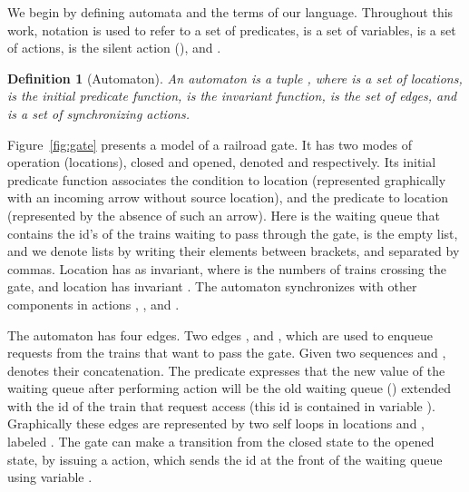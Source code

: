 \documentclass[submission,copyright,creativecommons,sharealike]{eptcs}
\newtheorem{definition}{Definition}
\begin{document}
We begin by defining automata and the terms of our language.
Throughout this work, notation  is used to refer to a set
of predicates,  is a set of variables,  is a
set of actions,  is the silent action (),
and .

\begin{definition}[Automaton]
  An automaton is a tuple , where  is a set of locations,  is the initial predicate function,  is the invariant function,  is the
  set of edges, and   is a set of
    synchronizing actions.
\end{definition}

Figure~\ref{fig:gate} presents a model of a railroad gate.
It has two modes of operation (locations), closed and opened, denoted
 and  respectively.
Its initial predicate function associates the condition  to location  (represented graphically with an incoming arrow
without source location), and the predicate  to location 
(represented by the absence of such an arrow). Here  is
the waiting queue that contains the id's of the trains waiting to pass
through the gate,  is the empty list, and we denote lists
by writing their elements between brackets, and separated by commas.
Location  has  as invariant, where  is the numbers of
trains crossing the gate, and location  has invariant .
The automaton synchronizes with other components in actions
, , and .

The automaton has four edges. Two edges , and ,
which are used to enqueue requests from the trains that want to pass
the gate. Given two sequences  and ,  denotes their concatenation. The predicate  expresses that the new value of the waiting queue after
performing action  will be the old waiting queue
() extended with the id of the train that request access
(this id is contained in variable ). Graphically these edges are
represented by two self loops in locations  and , labeled
.
The gate can make a transition from the closed state to the opened
state, by issuing a  action, which sends the id at the
front of the waiting queue using variable .
\end{document}

